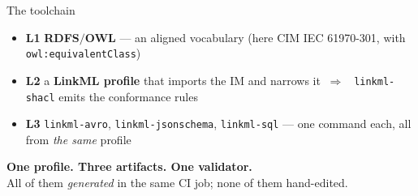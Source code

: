 \begin{frame}{The toolchain}
	\begin{itemize}
		\item \textbf{L1} \; \textbf{RDFS$/$OWL} — an aligned vocabulary (here CIM IEC 61970-301, with \texttt{owl:equivalentClass})
		\item \textbf{L2} \; a \textbf{LinkML profile} that imports the IM and narrows it \;$~\Rightarrow$~ \texttt{linkml-shacl} emits the conformance rules
		\item \textbf{L3} \; \texttt{linkml-avro}, \texttt{linkml-jsonschema}, \texttt{linkml-sql} — one command each, all from \emph{the same} profile
	\end{itemize}
	\vspace{0.3em}
	\begin{minipage}{0.99\linewidth}
	
	\end{minipage}
	\textbf{One profile. Three artifacts. One validator.}\\
	All of them \emph{generated} in the same CI job; none of them hand-edited.
\end{frame}
